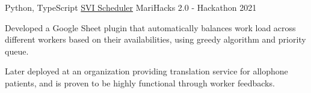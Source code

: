 \begin{cventries}
  \cventry
    {Python, TypeScript} %
    {\href{https://devpost.com/software/svi-scheduler}{SVI Scheduler}} %
    {MariHacks 2.0 - Hackathon} %
    {2021} %
    {
      \begin{cvitems} %
        \item {Developed a Google Sheet plugin that automatically balances work load across different workers based on their availabilities, using greedy algorithm and priority queue.}
        \item {Later deployed at an organization providing translation service for allophone patients, and is proven to be highly functional through worker feedbacks.}
      \end{cvitems}
    }

\end{cventries}
